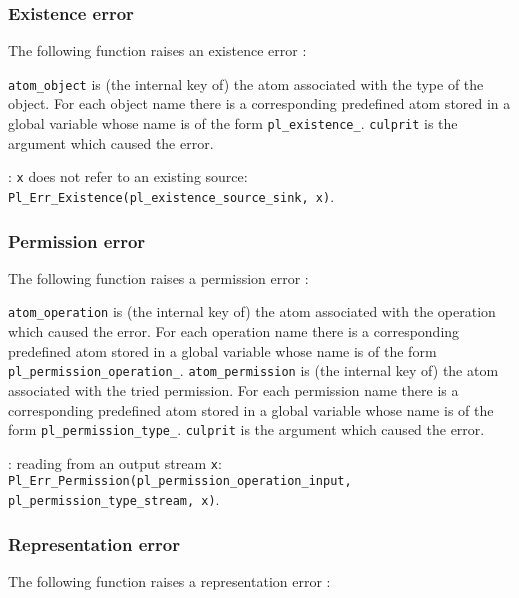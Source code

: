 \subsubsection{Existence error}
The following function raises an existence error :


\texttt{atom\_object} is (the internal key of) the atom associated with the
type of the object. For each object name  there is a
corresponding predefined atom stored in a global variable whose name is of
the form \texttt{pl\_existence\_}. \texttt{culprit} is the argument
which caused the error.

: \texttt{x} does not refer to an existing source:
\texttt{Pl\_Err\_Existence(pl\_existence\_source\_sink, x)}.

\subsubsection{Permission error}
The following function raises a permission error :


\texttt{atom\_operation} is (the internal key of) the atom associated with the
operation which caused the error. For each operation name
 there is a corresponding predefined atom stored in a
global variable whose name is of the form
\texttt{pl\_permission\_operation\_}. \texttt{atom\_permission} is
(the internal key of) the atom associated with the tried permission. For each
permission name  there is a corresponding predefined atom
stored in a global variable whose name is of the form
\texttt{pl\_permission\_type\_}. \texttt{culprit} is the argument
which caused the error.

: reading from an output stream \texttt{x}:
\texttt{Pl\_Err\_Permission(pl\_permission\_operation\_input, \\
pl\_permission\_type\_stream, x)}.

\subsubsection{Representation error}
The following function raises a representation error :

